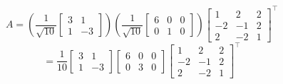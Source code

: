 \documentclass[12pt]{article}
\begin{document}
\[ A = \left(\dfrac{1}{\sqrt{10}}
	\begin{bmatrix}
		3 & 1\\
		1 & -3
	\end{bmatrix}\right)
\left(\dfrac{1}{\sqrt{10}}
	\begin{bmatrix}
		6 & 0 & 0\\
		0 & 1 & 0
	\end{bmatrix}\right)
	\begin{bmatrix}
		1 & 2 & 2\\
		-2 & -1 & 2\\
		2 & -2 & 1
	\end{bmatrix}^\intercal
\]
\[= \dfrac{1}{10}
\begin{bmatrix}
	3 & 1\\
	1 & -3
\end{bmatrix}
\begin{bmatrix}
	6 & 0 & 0\\
	0 & 3 & 0
\end{bmatrix}
\begin{bmatrix}
	1 & 2 & 2\\
	-2 & -1 & 2\\
	2 & -2 & 1
\end{bmatrix}^\intercal\]
\end{document}
